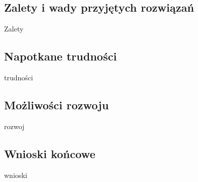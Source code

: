 \documentclass[12pt]{article}
\begin{document}
\begin{sloppypar}
{  \subsection{Zalety i wady przyjętych rozwiązań}
  {
    Zalety
  }
  \subsection{Napotkane trudności}
  {
    trudności
  }
  \subsection{Możliwości rozwoju}
  {
    rozwoj
  }
  \subsection{Wnioski końcowe}
  {
    wnioski
  }
}

\clearpage
\printbibliography[
  heading=bibintoc,
  title={Bibliografia}
]

\clearpage
\listoffigures

\clearpage
\listoftables

\clearpage
{}
\lstlistoflistings

\end{sloppypar}
\end{document}
